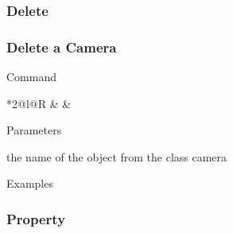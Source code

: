 \documentclass[9pt]{beamer}
\begin{document}
\subsubsection{Delete}

\begin{frame}[t] \frametitle{Delete a Camera}

	\begin{block}{Command}
		\begin{CmdFmt}{*{2}{@{}l}@{}R}
			 &
			 & \InstrItem
		\end{CmdFmt}
	\end{block}

	\begin{block}{Parameters}
		\begin{itemize}
			 the name of the object from the class camera
		\end{itemize}
	\end{block}

	\begin{block}{Examples}
	\end{block}

\end{frame}

\subsubsection{Property}
\end{document}
